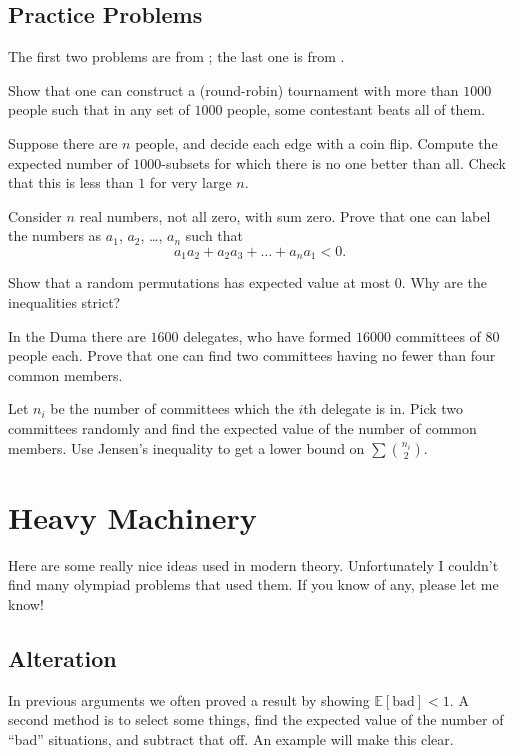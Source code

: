 \documentclass[11pt]{scrartcl}
\newcommand\EE{\mathbb E}
\begin{document}
\subsection{Practice Problems}
The first two problems are from \cite{ravi}; the last one is from \cite{poshen}.
\begin{problem}
  Show that one can construct a (round-robin) tournament with more than $1000$ people
  such that in any set of $1000$ people, some contestant beats all of them.
  \begin{sketch}
    Suppose there are $n$ people, and decide each edge with a coin flip.
    Compute the expected number of $1000$-subsets for which there is no one better than all.
    Check that this is less than $1$ for very large $n$.
  \end{sketch}
\end{problem}
\begin{problem}
  [BAMO 2004] Consider $n$ real numbers, not all zero, with sum zero.
  Prove that one can label the numbers as $a_1$, $a_2$, \dots, $a_n$ such that
  \[ a_1 a_2 + a_2 a_3 + \dots + a_n a_1 < 0. \]
  \begin{sketch}
    Show that a random permutations has expected value at most $0$.
    Why are the inequalities strict?
  \end{sketch}
\end{problem}
\begin{problem}
  [Russia 1996] In the Duma there are $1600$ delegates, who have formed $16000$ committees of $80$ people each. Prove that one can find two committees having no fewer than four common members.
  \begin{sketch}
    Let $n_i$ be the number of committees which the $i$th delegate is in.
    Pick two committees randomly and find the expected value of the number of common members.
    Use Jensen's inequality to get a lower bound on $\sum \binom{n_i}{2}$.
  \end{sketch}
\end{problem}




\section{Heavy Machinery}
Here are some really nice ideas used in modern theory.
Unfortunately I couldn't find many olympiad problems that used them.
If you know of any, please let me know!

\subsection{Alteration}
In previous arguments we often proved a result by showing $\EE[\text{bad}] < 1$.
A second method is to select some things,
find the expected value of the number of ``bad'' situations,
and subtract that off.
An example will make this clear.
\end{document}
